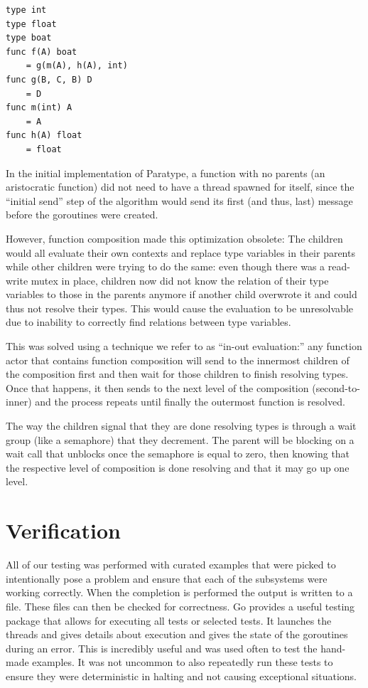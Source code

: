 \documentclass{acm_proc_article-sp}
\begin{document}
		\begin{lstlisting}[caption=Small Example of function composition,
		language=Paratype, label=lst:composition] 
type int
type float
type boat
func f(A) boat
	= g(m(A), h(A), int)
func g(B, C, B) D
	= D
func m(int) A
	= A
func h(A) float
	= float
		\end{lstlisting}

		In the initial implementation of Paratype, a function with no parents
		(an aristocratic function) did not need to have a thread spawned for
		itself, since the ``initial send'' step of the algorithm would send its
		first (and thus, last) message before the goroutines were created.

		However, function composition made this optimization obsolete: The
		children would all evaluate their own contexts and replace type
		variables in their parents while other children were trying to do the
		same: even though there was a read-write mutex in place, children now
		did not know the relation of their type variables to those in the
		parents anymore if another child overwrote it and could thus not
		resolve their types. This would cause the evaluation to be unresolvable
		due to inability to correctly find relations between type variables.

		This was solved using a technique we refer to as ``in-out evaluation:''
		any function actor that contains function composition will send to the
		innermost children of the composition first and then wait for those
		children to finish resolving types. Once that happens, it then sends
		to the next level of the composition (second-to-inner) and the process
		repeats until finally the outermost function is resolved.

		The way the children signal that they are done resolving types is
		through a wait group (like a semaphore) that they decrement. The parent
		will be blocking on a wait call that unblocks once the semaphore is
		equal to zero, then knowing that the respective level of composition is
		done resolving and that it may go up one level.

\section{Verification}
	All of our testing was performed with curated examples that were picked to
	intentionally pose a problem and ensure that each of the subsystems were
	working correctly. When the completion is performed the output is written
	to a file. These files can then be checked for correctness. Go provides a
	useful testing package that allows for executing all tests or selected
	tests.  It launches the threads and gives details about execution and gives
	the state of the goroutines during an error. This is incredibly useful and
	was used often to test the hand-made examples. It was not uncommon to also
	repeatedly run these tests to ensure they were deterministic in halting and
	not causing exceptional situations.  
	
\end{document}
